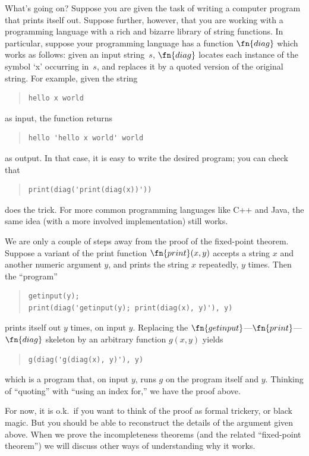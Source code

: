 \documentclass[../../../include/open-logic-section]{subfiles}
\begin{document}
\begin{explain}
What's going on? Suppose you are given the task of writing a computer
program that prints itself out. Suppose further, however, that you are
working with a programming language with a rich and bizarre library of
string functions. In particular, suppose your programming language has
a function $\fn{diag}$ which works as follows: given an input
string~$s$, $\fn{diag}$ locates each instance of the symbol `x'
occurring in~$s$, and replaces it by a quoted version of the original
string. For example, given the string
\begin{quote}
\begin{verbatim}
hello x world
\end{verbatim}
\end{quote}
as input, the function returns
\begin{quote}
\begin{verbatim}
hello 'hello x world' world
\end{verbatim}
\end{quote}
as output. In that case, it is easy to write the desired program; you
can check that
\begin{quote}
\begin{verbatim}
print(diag('print(diag(x))'))
\end{verbatim}
\end{quote}
does the trick. For more common programming languages like C++ and
Java, the same idea (with a more involved implementation) still works.

We are only a couple of steps away from the proof of the fixed-point
theorem. Suppose a variant of the print function $\fn{print}(x,y)$
accepts a string $x$ and another numeric argument $y$, and prints the
string $x$ repeatedly, $y$ times. Then the ``program''
\begin{quote}
\begin{verbatim}
getinput(y);
print(diag('getinput(y); print(diag(x), y)'), y)
\end{verbatim}
\end{quote}
prints itself out $y$ times, on input $y$. Replacing the
$\fn{getinput}$---$\fn{print}$---$\fn{diag}$ skeleton by an
arbitrary function $g(x,y)$ yields
\begin{quote}
\begin{verbatim}
g(diag('g(diag(x), y)'), y)
\end{verbatim}
\end{quote}
which is a program that, on input $y$, runs $g$ on the program itself
and $y$. Thinking of ``quoting'' with ``using an index for,'' we have
the proof above.

For now, it is o.k.\ if you want to think of the proof as formal
trickery, or black magic. But you should be able to reconstruct the
details of the argument given above. When we prove the incompleteness
theorems (and the related ``fixed-point theorem'') we will discuss
other ways of understanding why it works.
\end{explain}
\end{document}
